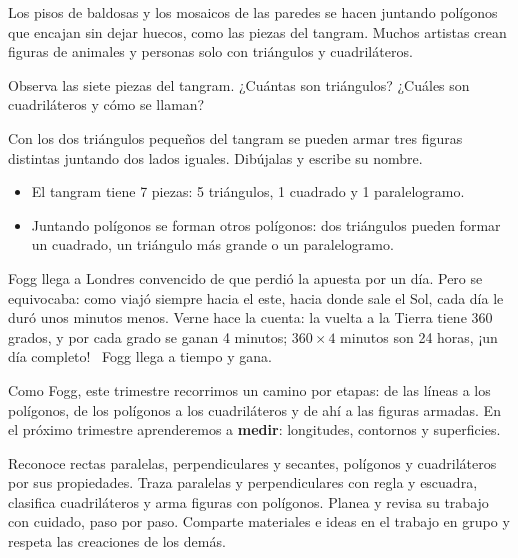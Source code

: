 \documentclass[11pt]{article}
\begin{document}
\begin{aplicacion}[Mosaicos]
Los pisos de baldosas y los mosaicos de las paredes se hacen juntando
polígonos que encajan sin dejar huecos, como las piezas del tangram. Muchos
artistas crean figuras de animales y personas solo con triángulos y
cuadriláteros.
\end{aplicacion}

\begin{preguntas}
\pregunta Observa las siete piezas del tangram. ¿Cuántas son triángulos?
¿Cuáles son cuadriláteros y cómo se llaman?

\pregunta Con los dos triángulos pequeños del tangram se pueden armar tres
figuras distintas juntando dos lados iguales. Dibújalas y escribe su nombre.
\espacio{4cm}
\end{preguntas}

\begin{resumen}
\begin{itemize}
  \item El tangram tiene 7 piezas: 5 triángulos, 1 cuadrado y 1 paralelogramo.
  \item Juntando polígonos se forman otros polígonos: dos triángulos pueden
        formar un cuadrado, un triángulo más grande o un paralelogramo.
\end{itemize}
\end{resumen}


Fogg llega a Londres convencido de que perdió la apuesta por un día. Pero se
equivocaba: como viajó siempre hacia el este, hacia donde sale el Sol, cada
día le duró unos minutos menos. Verne hace la cuenta: la vuelta a la Tierra
tiene 360 grados, y por cada grado se ganan 4 minutos; $360 \times 4$ minutos
son 24 horas, ¡un día completo!~\cite{verne} Fogg llega a tiempo y gana.

Como Fogg, este trimestre recorrimos un camino por etapas: de las líneas a
los polígonos, de los polígonos a los cuadriláteros y de ahí a las figuras
armadas. En el próximo trimestre aprenderemos a \textbf{medir}: longitudes,
contornos y superficies.

\matrizevaluacion
  {Reconoce rectas paralelas, perpendiculares y secantes, polígonos y cuadriláteros por sus propiedades.}
  {Traza paralelas y perpendiculares con regla y escuadra, clasifica cuadriláteros y arma figuras con polígonos.}
  {Planea y revisa su trabajo con cuidado, paso por paso.}
  {Comparte materiales e ideas en el trabajo en grupo y respeta las creaciones de los demás.}
\end{document}
